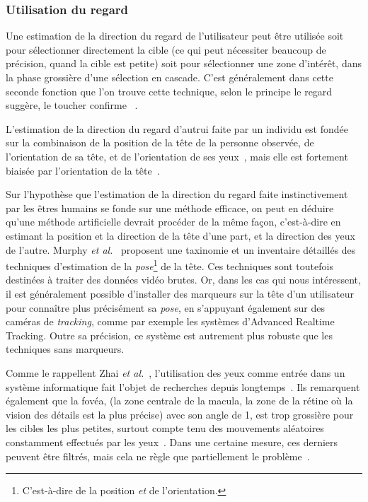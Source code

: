 	\subsubsection{Utilisation du regard}
	Une estimation de la direction du regard de l'utilisateur peut être utilisée soit pour sélectionner directement la cible (ce qui peut nécessiter beaucoup de précision, quand la cible est petite) soit pour sélectionner une zone d'intérêt, dans la phase grossière d'une sélection en cascade. C'est généralement dans cette seconde fonction que l'on trouve cette technique, selon le principe \og le regard suggère, le toucher confirme \fg{}~\cite{stellmach2012look}.

	L'estimation de la direction du regard d'autrui faite par un individu est fondée sur la combinaison de la position de la tête de la personne observée, de l'orientation de sa tête, et de l'orientation de ses yeux~\cite{langton2004influence}, mais elle est fortement biaisée par l'orientation de la tête~\cite{wollaston1824apparent}.
	
	Sur l'hypothèse que l'estimation de la direction du regard faite instinctivement par les êtres humains se fonde sur une méthode efficace, on peut en déduire qu'une méthode artificielle devrait procéder de la même façon, c'est-à-dire en estimant la position et la direction de la tête d'une part, et la direction des yeux de l'autre. Murphy \emph{et al.}~\cite{murphy2009head} proposent une taxinomie et un inventaire détaillés des techniques d'estimation de la \emph{pose}\footnote{C'est-à-dire de la position \emph{et} de l'orientation.} de la tête. Ces techniques sont toutefois destinées à traiter des données vidéo brutes. Or, dans les cas qui nous intéressent, il est généralement possible d'installer des marqueurs sur la tête d'un utilisateur pour connaître plus précisément sa \emph{pose}, en s'appuyant également sur des caméras de \emph{tracking}, comme par exemple les systèmes d'Advanced Realtime Tracking\footnotemark{}. Outre sa précision, ce système est autrement plus robuste que les techniques sans marqueurs.
	
	
	Comme le rappellent Zhai \emph{et al.}~\cite{zhai1999manual}, l'utilisation des yeux comme entrée dans un système informatique fait l'objet de recherches depuis longtemps~\cite{levine1981eye, bolt1982eyes, ware1987evaluation, jacob1990you}. Ils remarquent également que la fovéa, (la zone centrale de la macula, la zone de la rétine où la vision des détails est la plus précise) avec son angle de 1\textdegree{}, est trop grossière pour les cibles les plus petites, surtout compte tenu des mouvements aléatoires constamment effectués par les yeux~\cite{monden2005evaluation, vspakov2011comparison}. Dans une certaine mesure, ces derniers peuvent être filtrés, mais cela ne règle que partiellement le problème~\cite{zhang2008improving}.
	
